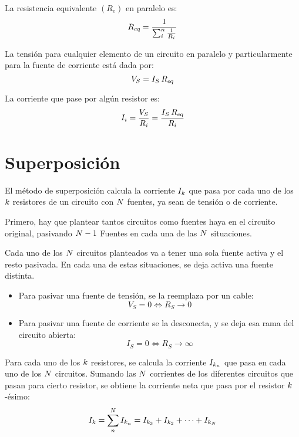 \documentclass[a5paper,12pt,twoside]{book}
\begin{document}
La resistencia equivalente $(R_e)$ en paralelo es:
\begin{equation*}
    {{R}_\textsl{{eq}}} = \frac{1}{\sum_i^n \frac{1}{R_i}}
\end{equation*}

La tensión para cualquier elemento de un circuito en paralelo y particularmente para la fuente de corriente está dada por:
\begin{equation*}
    V_S = I_S \, {{R}_\textsl{{eq}}}
\end{equation*}

La corriente que pase por algún resistor es:
\begin{equation*}
    I_i = \frac{V_S}{R_i} = \frac{I_S \, {{R}_\textsl{{eq}}}}{R_i}
\end{equation*}


\section{Superposición}

El método de superposición calcula la corriente $I_k$ que pasa por cada uno de los $k$ resistores de un circuito con $N$ fuentes, ya sean de tensión o de corriente.

Primero, hay que plantear tantos circuitos como fuentes haya en el circuito original, pasivando $N-1$ Fuentes en cada una de las $N$ situaciones.

Cada uno de los $N$ circuitos planteados va a tener una sola fuente activa y el resto pasivada. En cada una de estas situaciones, se deja activa una fuente distinta.

\begin{itemize}
    \item Para pasivar una fuente de tensión, se la reemplaza por un cable:
    \begin{equation*}
        V_S = 0 \iff R_S \to 0
    \end{equation*}

    \item Para pasivar una fuente de corriente se la desconecta, y se deja esa rama del circuito abierta:
    \begin{equation*}
        I_S = 0 \iff R_S \to \infty
    \end{equation*}
\end{itemize}

Para cada uno de los $k$ resistores, se calcula la corriente $I_{k_n}$ que pasa en cada uno de los $N$ circuitos. Sumando las $N$ corrientes de los diferentes circuitos que pasan para cierto resistor, se obtiene la corriente neta que pasa por el resistor $k$-ésimo:
\begin{equation*}
    I_k = \sum_n^N I_{k_n} = I_{k_3} + I_{k_2} + \dots + I_{k_N}
\end{equation*}
\end{document}
